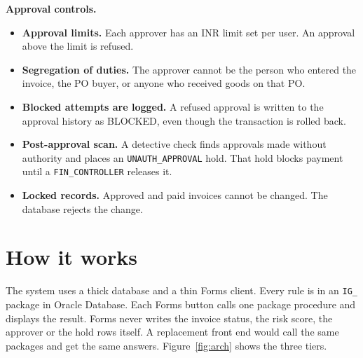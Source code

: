 \documentclass[10pt,a4paper]{article}
\begin{document}
\textbf{Approval controls.}
\begin{itemize}[leftmargin=1.2em,itemsep=2pt]
  \item \textbf{Approval limits.} Each approver has an INR limit set per user. An approval above the limit is refused.
  \item \textbf{Segregation of duties.} The approver cannot be the person who entered the invoice, the PO buyer, or anyone who received goods on that PO.
  \item \textbf{Blocked attempts are logged.} A refused approval is written to the approval history as BLOCKED, even though the transaction is rolled back.
  \item \textbf{Post-approval scan.} A detective check finds approvals made without authority and places an \texttt{UNAUTH\_APPROVAL} hold. That hold blocks payment until a \texttt{FIN\_CONTROLLER} releases it.
  \item \textbf{Locked records.} Approved and paid invoices cannot be changed. The database rejects the change.
\end{itemize}

\section{How it works}

The system uses a thick database and a thin Forms client. Every rule is in an \texttt{IG\_} package in Oracle Database. Each Forms button calls one package procedure and displays the result. Forms never writes the invoice status, the risk score, the approver or the hold rows itself. A replacement front end would call the same packages and get the same answers. Figure~\ref{fig:arch} shows the three tiers.
\end{document}
